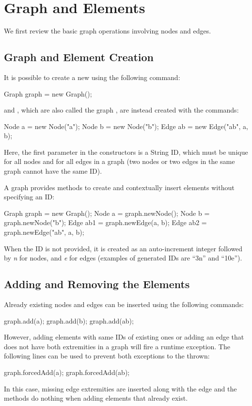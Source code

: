 \section{Graph and Elements}
We first review the basic graph operations involving nodes and edges.


\subsection{Graph and Element Creation}
It is possible to create a new  using the following command:
\begin{java}
Graph graph = new Graph();
\end{java}

 and , which are also called the graph , are instead created with the commands:
\begin{java}
Node a = new Node("a");
Node b = new Node("b");
Edge ab = new Edge("ab", a, b);
\end{java}
Here, the first parameter in the constructors is a String ID, which must be unique for all nodes and for all edges in a graph (two nodes or two edges in the same graph cannot have the same ID).

A graph provides methods to create and contextually insert elements without specifying an ID:
\begin{java}
Graph graph = new Graph();
Node a = graph.newNode();
Node b = graph.newNode("b");
Edge ab1 = graph.newEdge(a, b);
Edge ab2 = graph.newEdge("ab", a, b);
\end{java}
When the ID is not provided, it is created as an auto-increment integer followed by \emph{n} for nodes, and \emph{e} for edges (examples of generated IDs are ``3n'' and ``10e'').


\subsection{Adding and Removing the Elements}
Already existing nodes and edges can be inserted using the following commands:
\begin{java}
graph.add(a);
graph.add(b);
graph.add(ab);
\end{java}
However, adding elements with same IDs of existing ones or adding an edge that does not have both extremities in a graph will fire a runtime exception. The following lines can be used to prevent both exceptions to the thrown:
\begin{java}
graph.forcedAdd(a);
graph.forcedAdd(ab);
\end{java}
In this case, missing edge extremities are inserted along with the edge and the methods do nothing when adding elements that already exist.


